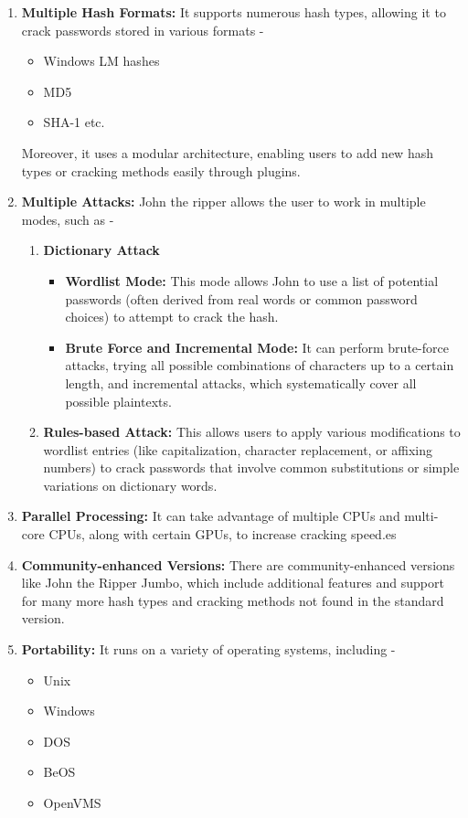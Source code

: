 \documentclass[12pt, A4Paper]{article}
\begin{document}
\begin{enumerate}
    \item \textbf{Multiple Hash Formats:} It supports numerous hash types, allowing it to crack passwords stored in various formats - 
    \begin{itemize}
        \item Windows LM hashes
        \item MD5
        \item SHA-1 etc.
    \end{itemize}
    Moreover, it uses a modular architecture, enabling users to add new hash types or cracking methods easily through plugins.

    \item \textbf{Multiple Attacks:} John the ripper allows the user to work in multiple modes, such as -

    \begin{enumerate}
        \item \textbf{Dictionary Attack}
        \begin{itemize}
            \item \textbf{Wordlist Mode:} This mode allows John to use a list of potential passwords (often derived from real words or common password choices) to attempt to crack the hash.
            \item \textbf{Brute Force and Incremental Mode:}  It can perform brute-force attacks, trying all possible combinations of characters up to a certain length, and incremental attacks, which systematically cover all possible plaintexts.
        \end{itemize}   
        \item \textbf{Rules-based Attack:}  This allows users to apply various modifications to wordlist entries (like capitalization, character replacement, or affixing numbers) to crack passwords that involve common substitutions or simple variations on dictionary words.
    \end{enumerate}

    \item \textbf{Parallel Processing:} It can take advantage of multiple CPUs and multi-core CPUs, along with certain GPUs, to increase cracking speed.es

    \item \textbf{Community-enhanced Versions:}  There are community-enhanced versions like John the Ripper Jumbo, which include additional features and support for many more hash types and cracking methods not found in the standard version.

    \item \textbf{Portability:} It runs on a variety of operating systems, including -  
    \begin{itemize}
        \item Unix
        \item Windows
        \item DOS
        \item BeOS
        \item OpenVMS
    \end{itemize}
\end{enumerate}
\vspace{0.4cm}
\end{document}
